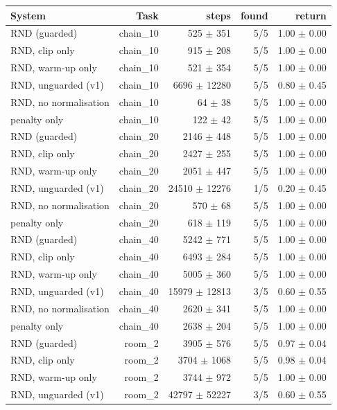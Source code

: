 \begin{tabular}{lrrrr}
\hline
System & Task & steps & found & return \\
\hline
RND (guarded) & chain\_10 & 525 $\pm$ 351 & 5/5 & 1.00 $\pm$ 0.00 \\
RND, clip only & chain\_10 & 915 $\pm$ 208 & 5/5 & 1.00 $\pm$ 0.00 \\
RND, warm-up only & chain\_10 & 521 $\pm$ 354 & 5/5 & 1.00 $\pm$ 0.00 \\
RND, unguarded (v1) & chain\_10 & 6696 $\pm$ 12280 & 5/5 & 0.80 $\pm$ 0.45 \\
RND, no normalisation & chain\_10 & 64 $\pm$ 38 & 5/5 & 1.00 $\pm$ 0.00 \\
penalty only & chain\_10 & 122 $\pm$ 42 & 5/5 & 1.00 $\pm$ 0.00 \\
RND (guarded) & chain\_20 & 2146 $\pm$ 448 & 5/5 & 1.00 $\pm$ 0.00 \\
RND, clip only & chain\_20 & 2427 $\pm$ 255 & 5/5 & 1.00 $\pm$ 0.00 \\
RND, warm-up only & chain\_20 & 2051 $\pm$ 447 & 5/5 & 1.00 $\pm$ 0.00 \\
RND, unguarded (v1) & chain\_20 & 24510 $\pm$ 12276 & 1/5 & 0.20 $\pm$ 0.45 \\
RND, no normalisation & chain\_20 & 570 $\pm$ 68 & 5/5 & 1.00 $\pm$ 0.00 \\
penalty only & chain\_20 & 618 $\pm$ 119 & 5/5 & 1.00 $\pm$ 0.00 \\
RND (guarded) & chain\_40 & 5242 $\pm$ 771 & 5/5 & 1.00 $\pm$ 0.00 \\
RND, clip only & chain\_40 & 6493 $\pm$ 284 & 5/5 & 1.00 $\pm$ 0.00 \\
RND, warm-up only & chain\_40 & 5005 $\pm$ 360 & 5/5 & 1.00 $\pm$ 0.00 \\
RND, unguarded (v1) & chain\_40 & 15979 $\pm$ 12813 & 3/5 & 0.60 $\pm$ 0.55 \\
RND, no normalisation & chain\_40 & 2620 $\pm$ 341 & 5/5 & 1.00 $\pm$ 0.00 \\
penalty only & chain\_40 & 2638 $\pm$ 204 & 5/5 & 1.00 $\pm$ 0.00 \\
RND (guarded) & room\_2 & 3905 $\pm$ 576 & 5/5 & 0.97 $\pm$ 0.04 \\
RND, clip only & room\_2 & 3704 $\pm$ 1068 & 5/5 & 0.98 $\pm$ 0.04 \\
RND, warm-up only & room\_2 & 3744 $\pm$ 972 & 5/5 & 1.00 $\pm$ 0.00 \\
RND, unguarded (v1) & room\_2 & 42797 $\pm$ 52227 & 3/5 & 0.60 $\pm$ 0.55 \\

\end{tabular}
